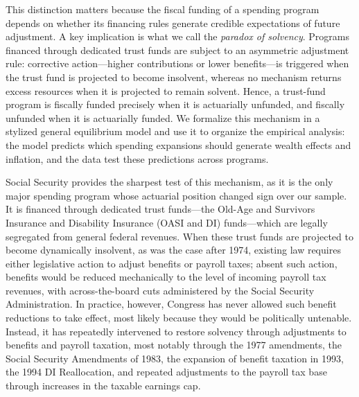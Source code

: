 \documentclass[12pt]{article}%
\theoremstyle{remark}
\begin{document}
This distinction matters because the fiscal funding of a spending program depends on whether its financing rules generate credible expectations of future adjustment. A key implication is what we call the \textit{paradox of solvency}. Programs financed through dedicated trust funds are subject to an asymmetric adjustment rule: corrective action—higher contributions or lower benefits—is triggered when the trust fund is projected to become insolvent, whereas no mechanism returns excess resources when it is projected to remain solvent. Hence, a trust-fund program is fiscally funded precisely when it is actuarially unfunded, and fiscally unfunded when it is actuarially funded. We formalize this mechanism in a stylized general equilibrium model and use it to organize the empirical analysis: the model predicts which spending expansions should generate wealth effects and inflation, and the data test these predictions across programs.

Social Security provides the sharpest test of this mechanism, as it is the only major spending program whose actuarial position changed sign over our sample. It is financed through dedicated trust funds—the Old-Age and Survivors Insurance and Disability Insurance (OASI and DI) funds—which are legally segregated from general federal revenues. When these trust funds are projected to become dynamically insolvent, as was the case after 1974, existing law requires either legislative action to adjust benefits or payroll taxes; absent such action, benefits would be reduced mechanically to the level of incoming payroll tax revenues, with across-the-board cuts administered by the Social Security Administration. In practice, however, Congress has never allowed such benefit reductions to take effect, most likely because they would be politically untenable. Instead, it has repeatedly intervened to restore solvency through adjustments to benefits and payroll taxation, most notably through the 1977 amendments, the Social Security Amendments of 1983, the expansion of benefit taxation in 1993, the 1994 DI Reallocation, and repeated adjustments to the payroll tax base through increases in the taxable earnings cap.
\end{document}
